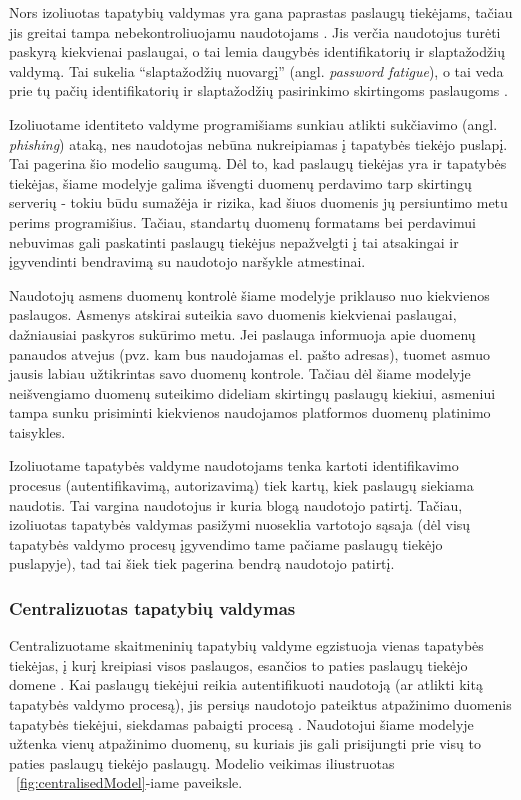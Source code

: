 
Nors izoliuotas tapatybių valdymas yra gana paprastas paslaugų tiekėjams, tačiau jis greitai tampa
nebekontroliuojamu naudotojams \cite{Josang2005}. Jis verčia naudotojus turėti paskyrą kiekvienai paslaugai, o tai lemia
daugybės identifikatorių ir slaptažodžių valdymą. Tai sukelia \enquote{slaptažodžių nuovargį} (angl. 
\textit{password fatigue}), o tai veda prie tų pačių identifikatorių ir slaptažodžių pasirinkimo skirtingoms paslaugoms \cite{Dhamija2008}.

Izoliuotame identiteto valdyme programišiams sunkiau atlikti sukčiavimo (angl. \textit{phishing}) ataką, nes naudotojas
nebūna nukreipiamas į tapatybės tiekėjo puslapį. Tai pagerina šio modelio saugumą. Dėl to, kad paslaugų tiekėjas yra ir tapatybės tiekėjas,
šiame modelyje galima išvengti duomenų perdavimo tarp skirtingų serverių - tokiu būdu sumažėja ir rizika, kad šiuos duomenis
jų persiuntimo metu perims programišius. Tačiau, standartų duomenų formatams bei perdavimui nebuvimas gali paskatinti paslaugų
tiekėjus nepažvelgti į tai atsakingai ir įgyvendinti bendravimą su naudotojo naršykle atmestinai.

Naudotojų asmens duomenų kontrolė šiame modelyje priklauso nuo kiekvienos paslaugos. Asmenys atskirai suteikia savo duomenis
kiekvienai paslaugai, dažniausiai paskyros sukūrimo metu. Jei paslauga informuoja apie duomenų panaudos atvejus (pvz. kam bus naudojamas
el. pašto adresas), tuomet asmuo jausis labiau užtikrintas savo duomenų kontrole. Tačiau dėl šiame modelyje neišvengiamo duomenų suteikimo
dideliam skirtingų paslaugų kiekiui, asmeniui tampa sunku prisiminti kiekvienos naudojamos platformos duomenų platinimo taisykles.

Izoliuotame tapatybės valdyme naudotojams tenka kartoti identifikavimo procesus (autentifikavimą, autorizavimą) tiek kartų, kiek paslaugų siekiama
naudotis. Tai vargina naudotojus ir kuria blogą naudotojo patirtį. Tačiau, izoliuotas tapatybės valdymas pasižymi nuoseklia vartotojo sąsaja (dėl 
visų tapatybės valdymo procesų įgyvendimo tame pačiame paslaugų tiekėjo puslapyje), tad tai šiek tiek pagerina bendrą naudotojo patirtį.

\subsubsection{Centralizuotas tapatybių valdymas}

Centralizuotame skaitmeninių tapatybių valdyme egzistuoja vienas tapatybės tiekėjas, į kurį kreipiasi visos paslaugos,
esančios to paties paslaugų tiekėjo domene \cite{Josang2005}. Kai paslaugų tiekėjui
reikia autentifikuoti naudotoją (ar atlikti kitą tapatybės valdymo procesą), jis persiųs naudotojo pateiktus atpažinimo duomenis tapatybės tiekėjui,
siekdamas pabaigti procesą \cite{Cao2010}. Naudotojui šiame modelyje užtenka vienų atpažinimo duomenų, su kuriais jis gali prisijungti prie visų to paties
paslaugų tiekėjo paslaugų. Modelio veikimas iliustruotas ~\ref{fig:centralisedModel}-iame paveiksle.

